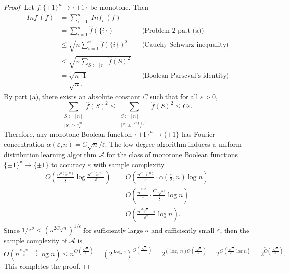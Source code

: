 \documentclass[letterpaper, reqno,11pt]{article}
\DeclareMathOperator{\Inf}{\mathit{Inf}}
\begin{document}
\begin{enumerate}
\begin{enumerate}
    \begin{proof}
      Let $f : \{ \pm 1 \}^n \to \{ \pm 1 \}$ be monotone. Then
      \begin{align*}
        \Inf(f) &= \sum_{i = 1}^n \Inf_i(f) \\
        &= \sum_{i = 1}^n \hat{f}(\{ i \}) && \text{(Problem 2 part (a))} \\
        &\leq \sqrt{n\sum_{i = 1}^n \hat{f}(\{ i \})^2} && \text{(Cauchy-Schwarz inequality)} \\
        &\leq \sqrt{n\sum_{S \subset [n]} \hat{f}(S)^2} \\
        &= \sqrt{n \cdot 1} && \text{(Boolean Parseval's identity)} \\
        &= \sqrt{n}.
      \end{align*}
      By part (a), there exists an absolute constant $C$ such that for all $\varepsilon > 0$,
      $$ \sum_{\substack{S \subset [n] \\ |S| \geq \frac{\sqrt{n}}{\varepsilon}}} \hat{f}(S)^2 \leq \sum_{\substack{S \subset [n] \\ |S| \geq \frac{\Inf(f)}{\varepsilon}}} \hat{f}(S)^2 \leq C\varepsilon. $$
      Therefore, any monotone Boolean function $\{ \pm 1 \}^n \to \{ \pm 1 \}$ has Fourier concentration $\alpha(\varepsilon, n) = C\sqrt{n}/\varepsilon$. The low degree algorithm induces a uniform distribution learning algorithm $\mathcal A$ for the class of monotone Boolean functions $\{ \pm 1 \}^n \to \{ \pm 1 \}$ to accuracy $\varepsilon$ with sample complexity
      \begin{align*}
        O\left(\frac{n^{\alpha\left(\frac{\varepsilon}{2}, n\right)}}{\frac{\varepsilon}{2}} \log \frac{n^{\alpha\left(\frac{\varepsilon}{2}, n\right)}}{\delta}\right) &= O\left(\frac{n^{\alpha\left(\frac{\varepsilon}{2}, n\right)}}{\varepsilon} \cdot \alpha\left(\frac{\varepsilon}{2}, n\right) \log n\right) \\
        &= O\left(\frac{n^{\frac{C\sqrt[]{n}}{\frac{\varepsilon}{2}}}}{\varepsilon} \cdot \frac{C\sqrt[]{n}}{\frac{\varepsilon}{2}} \log n\right) \\
        &= O\left(\frac{n^{\frac{2C\sqrt[]{n}}{\varepsilon} + \frac{1}{2}}}{\varepsilon^2} \log n\right).
      \end{align*}
      Since $1/\varepsilon^2 \leq (n^{2C\sqrt{n}})^{1/\varepsilon}$ for sufficiently large $n$ and sufficiently small $\varepsilon$, then the sample complexity of $\mathcal A$ is
      $$ O\left(n^{\frac{C\sqrt[]{n}}{\varepsilon} + \frac{1}{2}} \log n\right) \leq n^{\Theta\left(\frac{\sqrt[]{n}}{\varepsilon}\right)} = \left(2^{\log_2 n}\right)^{\Theta\left(\frac{\sqrt[]{n}}{\varepsilon}\right)} = 2^{(\log_2 n) \Theta\left(\frac{\sqrt[]{n}}{\varepsilon}\right)} = 2^{\Theta\left(\frac{\sqrt[]{n}}{\varepsilon} \log n\right)} = 2^{\widetilde{O}\left(\frac{\sqrt[]{n}}{\varepsilon}\right)}. $$
      This completes the proof.
    \end{proof}
  \end{enumerate}


\end{enumerate}
\end{document}
